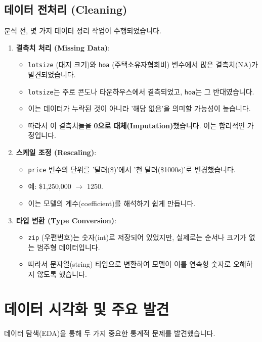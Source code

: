 \documentclass[11pt,a4paper]{book}
\theoremstyle{definition}
\begin{document}
\subsection{데이터 전처리 (Cleaning)}

분석 전, 몇 가지 데이터 정리 작업이 수행되었습니다.
\begin{enumerate}
    \item \textbf{결측치 처리 (Missing Data)}:
        \begin{itemize}
            \item \texttt{lotsize} (대지 크기)와 \texttt{hoa} (주택소유자협회비) 변수에서 많은 결측치(NA)가 발견되었습니다.
            \item \texttt{lotsize}는 주로 콘도나 타운하우스에서 결측되었고, \texttt{hoa}는 그 반대였습니다.
            \item 이는 데이터가 누락된 것이 아니라 '해당 없음'을 의미할 가능성이 높습니다.
            \item 따라서 이 결측치들을 \textbf{0으로 대체(Imputation)}했습니다. 이는 합리적인 가정입니다.
        \end{itemize}
    \item \textbf{스케일 조정 (Rescaling)}:
        \begin{itemize}
            \item \texttt{price} 변수의 단위를 '달러(\$)'에서 '천 달러(\$1000s)'로 변경했습니다.
            \item 예: \$1,250,000 $\to$ 1250.
            \item 이는 모델의 계수(coefficient)를 해석하기 쉽게 만듭니다.
        \end{itemize}
    \item \textbf{타입 변환 (Type Conversion)}:
        \begin{itemize}
            \item \texttt{zip} (우편번호)는 숫자(int)로 저장되어 있었지만, 실제로는 순서나 크기가 없는 범주형 데이터입니다.
            \item 따라서 문자열(string) 타입으로 변환하여 모델이 이를 연속형 숫자로 오해하지 않도록 했습니다.
        \end{itemize}
\end{enumerate}

\section{데이터 시각화 및 주요 발견}

데이터 탐색(EDA)을 통해 두 가지 중요한 통계적 문제를 발견했습니다.
\end{document}
